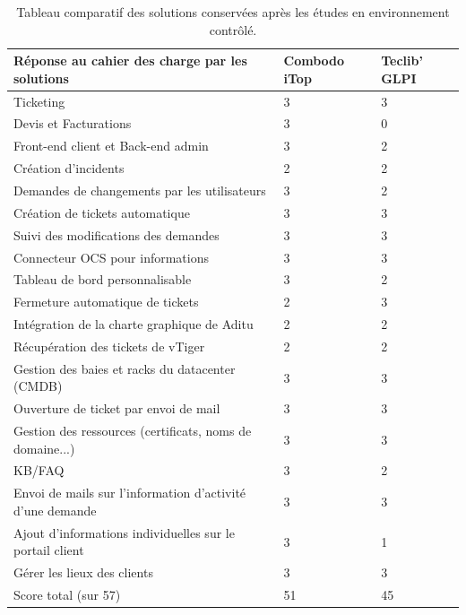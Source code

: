 \begin{table}[H]
    \centering
    \captionsetup{justification=centering}
    \begin{tabular}{|l|l|l|}
    \hline
    Réponse au cahier des charge par les solutions            & Combodo iTop & Teclib' GLPI \\ \hline
    Ticketing                                                 & 3            & 3            \\
    Devis et Facturations                                     & 3            & 0            \\
    Front-end client et Back-end admin                        & 3            & 2            \\
    Création d'incidents                                      & 2            & 2            \\
    Demandes de changements par les utilisateurs              & 3            & 2            \\
    Création de tickets automatique                           & 3            & 3            \\
    Suivi des modifications des demandes                      & 3            & 3            \\
    Connecteur OCS pour informations                          & 3            & 3            \\
    Tableau de bord personnalisable                           & 3            & 2            \\
    Fermeture automatique de tickets                          & 2            & 3            \\
    Intégration de la charte graphique de Aditu               & 2            & 2            \\
    Récupération des tickets de vTiger                        & 2            & 2            \\
    Gestion des baies et racks du datacenter (CMDB)           & 3            & 3            \\
    Ouverture de ticket par envoi de mail                     & 3            & 3            \\
    Gestion des ressources (certificats, noms de domaine...)  & 3            & 3            \\
    KB/FAQ                                                    & 3            & 2            \\
    Envoi de mails sur l'information d'activité d'une demande & 3            & 3            \\
    Ajout d'informations individuelles sur le portail client  & 3            & 1            \\
    Gérer les lieux des clients                               & 3            & 3            \\ \hline
    Score total (sur 57)                                      & 51           & 45           \\
    \hline
    \end{tabular}
    \caption{Tableau comparatif des solutions conservées après les études en environnement contrôlé.}
    \label{tab:comparatif} 
\end{table}

